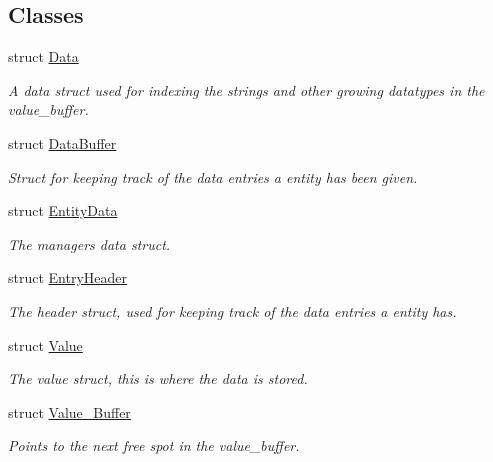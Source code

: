 \subsection*{Classes}
\begin{DoxyCompactItemize}
\item 
struct \hyperlink{struct_ensum_1_1_components_1_1_data_manager_1_1_data}{Data}
\begin{DoxyCompactList}\small\item\em A data struct used for indexing the strings and other growing datatypes in the value\+\_\+buffer. \end{DoxyCompactList}\item 
struct \hyperlink{struct_ensum_1_1_components_1_1_data_manager_1_1_data_buffer}{Data\+Buffer}
\begin{DoxyCompactList}\small\item\em Struct for keeping track of the data entries a entity has been given. \end{DoxyCompactList}\item 
struct \hyperlink{struct_ensum_1_1_components_1_1_data_manager_1_1_entity_data}{Entity\+Data}
\begin{DoxyCompactList}\small\item\em The managers data struct. \end{DoxyCompactList}\item 
struct \hyperlink{struct_ensum_1_1_components_1_1_data_manager_1_1_entry_header}{Entry\+Header}
\begin{DoxyCompactList}\small\item\em The header struct, used for keeping track of the data entries a entity has. \end{DoxyCompactList}\item 
struct \hyperlink{struct_ensum_1_1_components_1_1_data_manager_1_1_value}{Value}
\begin{DoxyCompactList}\small\item\em The value struct, this is where the data is stored. \end{DoxyCompactList}\item 
struct \hyperlink{struct_ensum_1_1_components_1_1_data_manager_1_1_value___buffer}{Value\+\_\+\+Buffer}
\begin{DoxyCompactList}\small\item\em Points to the next free spot in the value\+\_\+buffer. \end{DoxyCompactList}\end{DoxyCompactItemize}
